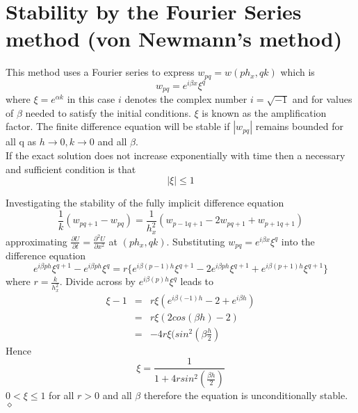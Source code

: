 \section{Stability by the Fourier Series method (von Newmann's method)}
This method uses a Fourier series to express $w_{pq}=w(ph_x,qk)$
which is
\[ w_{pq}=e^{i\beta x}\xi^{q} \]
where $\xi=e^{\alpha k}$ in this case $i$ denotes the complex number
$i=\sqrt{-1}$ and for values of $\beta$ needed to satisfy the initial conditions.
$\xi$ is known as the amplification factor.
The finite difference equation will be stable if $|w_{pq}|$ remains bounded for all q as $h \rightarrow 0, k\rightarrow 0$ and all $\beta$.\\
If the exact solution does not increase exponentially with time then a necessary
and sufficient condition is that 
\[ |\xi|\leq 1 \]
\begin{example}
Investigating the stability of the fully implicit difference equation
\[\frac{1}{k}(w_{pq+1}-w_{pq})=\frac{1}{h_x^2}(w_{p-1q+1}-2w_{pq+1}+w_{p+1q+1})\]
approximating $\frac{\partial U}{\partial t}=\frac{\partial^2 U}{\partial x^2}$ at $(ph_x,qk)$. Substituting $w_{pq}=e^{i\beta x}\xi^{q}$ into the difference equation
\[e^{i\beta ph}\xi^{q+1}-e^{i\beta ph}\xi^{q}=
r\{
e^{i\beta (p-1)h}\xi^{q+1}
-2e^{i\beta ph}\xi^{q+1}
+
e^{i\beta (p+1)h}\xi^{q+1}
 \}
\]
where $r=\frac{k}{h_x^2}$. Divide across by $e^{i\beta (p)h}\xi^{q}$ leads to
\begin{eqnarray*} \xi-1&=&r\xi(e^{i\beta (-1)h}
-2
+
e^{i\beta h})\\
&=& r \xi(2cos(\beta h)-2)\\
&=&-4r\xi(sin^2(\beta\frac{h}{2})
\end{eqnarray*}
Hence \[\xi = \frac{1}{1+4rsin^2(\frac{\beta h}{2})}\]
$0 < \xi \leq 1$ for all $r>0$ and all $\beta$ therefore the equation is unconditionally stable.
$\diamond$
\end{example}
